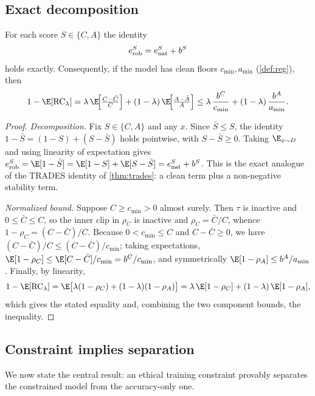 \subsection{Exact decomposition}

\begin{theorem}\label{thm:decomp}
For each score $S\in\{C,A\}$ the identity
\begin{equation}\label{eq:decomp}
  e_{\mathrm{rob}}^S=e_{\mathrm{nat}}^S+b^S
\end{equation}
holds exactly. Consequently, if the model has clean floors $c_{\min},a_{\min}$
\textup{(\cref{def:reg})}, then
\begin{equation}\label{eq:normbound}
  1-\E[\RC_\lambda]
    =\lambda\,\E\!\Big[\tfrac{C-\bar C}{C}\Big]
     +(1-\lambda)\,\E\!\Big[\tfrac{A-\bar A}{A}\Big]
    \le \lambda\,\frac{b^C}{c_{\min}}+(1-\lambda)\,\frac{b^A}{a_{\min}}.
\end{equation}
\end{theorem}

\begin{proof}
\emph{Decomposition.} Fix $S\in\{C,A\}$ and any $x$. Since $\bar S\le S$, the
identity $1-\bar S=(1-S)+(S-\bar S)$ holds pointwise, with $S-\bar S\ge0$. Taking
$\E_{x\sim D}$ and using linearity of expectation gives
$e_\rob^S=\E[1-\bar S]=\E[1-S]+\E[S-\bar S]=e_\nat^S+b^S$. This is the exact
analogue of the TRADES identity of \cref{thm:trades}: a clean term plus a
non-negative stability term.

\emph{Normalized bound.} Suppose $C\ge c_{\min}>0$ almost surely. Then $\tau$ is
inactive and $0\le\bar C\le C$, so the inner clip in $\rho_C$ is inactive and
$\rho_C=\bar C/C$, whence $1-\rho_C=(C-\bar C)/C$. Because $0<c_{\min}\le C$ and
$C-\bar C\ge0$, we have $(C-\bar C)/C\le(C-\bar C)/c_{\min}$; taking expectations,
$\E[1-\rho_C]\le\E[C-\bar C]/c_{\min}=b^C/c_{\min}$, and symmetrically
$\E[1-\rho_A]\le b^A/a_{\min}$. Finally, by linearity,
\[
  1-\E[\RC_\lambda]=\E\big[\lambda(1-\rho_C)+(1-\lambda)(1-\rho_A)\big]
    =\lambda\,\E[1-\rho_C]+(1-\lambda)\,\E[1-\rho_A],
\]
which gives the stated equality and, combining the two component bounds, the
inequality.
\end{proof}

\subsection{Constraint implies separation}

We now state the central result: an ethical training constraint provably separates
the constrained model from the accuracy-only one.

